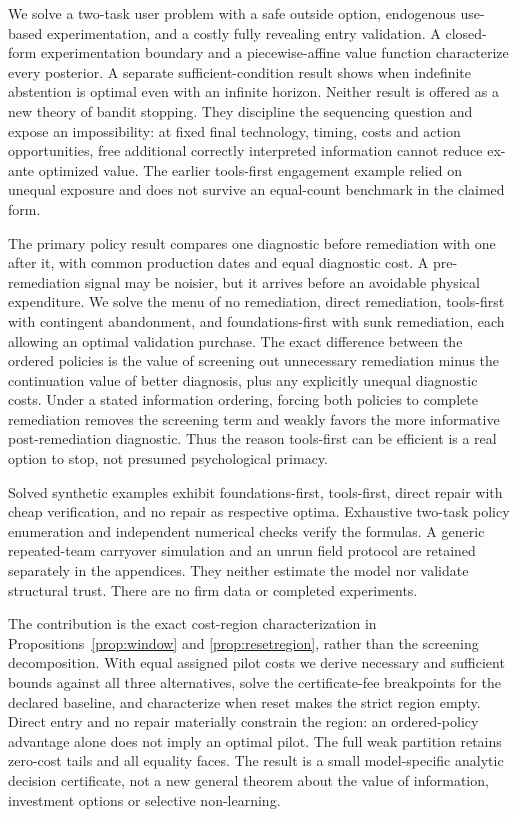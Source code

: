 \documentclass[11pt]{article}
\begin{document}
We solve a two-task user problem with a safe outside option, endogenous use-based experimentation, and a costly fully revealing entry validation. A closed-form experimentation boundary and a piecewise-affine value function characterize every posterior. A separate sufficient-condition result shows when indefinite abstention is optimal even with an infinite horizon. Neither result is offered as a new theory of bandit stopping. They discipline the sequencing question and expose an impossibility: at fixed final technology, timing, costs and action opportunities, free additional correctly interpreted information cannot reduce ex-ante optimized value. The earlier tools-first engagement example relied on unequal exposure and does not survive an equal-count benchmark in the claimed form.

The primary policy result compares one diagnostic before remediation with one after it, with common production dates and equal diagnostic cost. A pre-remediation signal may be noisier, but it arrives before an avoidable physical expenditure. We solve the menu of no remediation, direct remediation, tools-first with contingent abandonment, and foundations-first with sunk remediation, each allowing an optimal validation purchase. The exact difference between the ordered policies is the value of screening out unnecessary remediation minus the continuation value of better diagnosis, plus any explicitly unequal diagnostic costs. Under a stated information ordering, forcing both policies to complete remediation removes the screening term and weakly favors the more informative post-remediation diagnostic. Thus the reason tools-first can be efficient is a real option to stop, not presumed psychological primacy.

Solved synthetic examples exhibit foundations-first, tools-first, direct repair with cheap verification, and no repair as respective optima. Exhaustive two-task policy enumeration and independent numerical checks verify the formulas. A generic repeated-team carryover simulation and an unrun field protocol are retained separately in the appendices. They neither estimate the model nor validate structural trust. There are no firm data or completed experiments.

The contribution is the exact cost-region characterization in Propositions~\ref{prop:window} and \ref{prop:resetregion}, rather than the screening decomposition. With equal assigned pilot costs we derive necessary and sufficient bounds against all three alternatives, solve the certificate-fee breakpoints for the declared baseline, and characterize when reset makes the strict region empty. Direct entry and no repair materially constrain the region: an ordered-policy advantage alone does not imply an optimal pilot. The full weak partition retains zero-cost tails and all equality faces. The result is a small model-specific analytic decision certificate, not a new general theorem about the value of information, investment options or selective non-learning.
\end{document}
